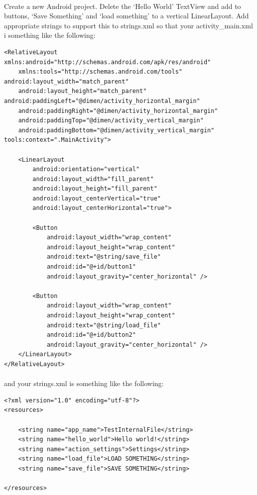 \documentclass[12pt, a4paper, twoside]{book}
\begin{document}
\paragraph{} Create a new Android project. Delete the `Hello World' TextView and add to buttons, `Save Something' and `load something' to a vertical LinearLayout. Add appropriate strings to support this to strings.xml so that your activity\_main.xml i something like the following:

\begin{lstlisting}
<RelativeLayout xmlns:android="http://schemas.android.com/apk/res/android"
    xmlns:tools="http://schemas.android.com/tools" android:layout_width="match_parent"
    android:layout_height="match_parent" android:paddingLeft="@dimen/activity_horizontal_margin"
    android:paddingRight="@dimen/activity_horizontal_margin"
    android:paddingTop="@dimen/activity_vertical_margin"
    android:paddingBottom="@dimen/activity_vertical_margin" tools:context=".MainActivity">

    <LinearLayout
        android:orientation="vertical"
        android:layout_width="fill_parent"
        android:layout_height="fill_parent"
        android:layout_centerVertical="true"
        android:layout_centerHorizontal="true">

        <Button
            android:layout_width="wrap_content"
            android:layout_height="wrap_content"
            android:text="@string/save_file"
            android:id="@+id/button1"
            android:layout_gravity="center_horizontal" />

        <Button
            android:layout_width="wrap_content"
            android:layout_height="wrap_content"
            android:text="@string/load_file"
            android:id="@+id/button2"
            android:layout_gravity="center_horizontal" />
    </LinearLayout>
</RelativeLayout>
\end{lstlisting}

\paragraph{} and your strings.xml is something like the following:

\begin{lstlisting}
<?xml version="1.0" encoding="utf-8"?>
<resources>

    <string name="app_name">TestInternalFile</string>
    <string name="hello_world">Hello world!</string>
    <string name="action_settings">Settings</string>
    <string name="load_file">LOAD SOMETHING</string>
    <string name="save_file">SAVE SOMETHING</string>

</resources>
\end{lstlisting}
\end{document}
